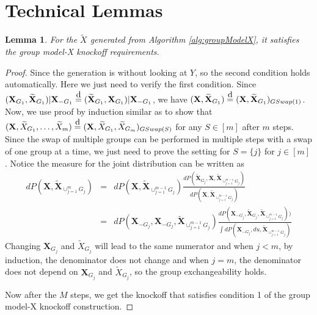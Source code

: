 \documentclass[11pt]{article}
\theoremstyle{plain}
\newtheorem{lemma}[theorem]{Lemma}
\theoremstyle{definition}
\theoremstyle{remark}
\newcommand\eqd{\stackrel{\mathclap{\normalfont\mbox{d}}}{=}}
\newcommand{\X}{\mathbf{X}}
\newcommand{\0}{\mathbf{0}}
\begin{document}
\section{Technical Lemmas}
\begin{lemma}\label{lem:gsknock}
For the $\widetilde{X}$ generated from Algorithm \ref{alg:groupModelX}, it satisfies the group model-X knockoff requirements.
\end{lemma}
\begin{proof}
Since the generation is without looking at $Y$, so the second condition holds automatically. Here we just need to verify the first condition. Since $(\X_{G_1},\widetilde{\X}_{G_1})|\X_{-G_1}\eqd (\widetilde{\X}_{G_1},\X_{G_1})|\X_{-G_1}$, we have $(\X,\widetilde{\X}_{G_1})\eqd (\X,\widetilde{\X}_{G_1})_{GSwap(1)}$. Now, we use proof by induction similar as \cite{candes2018panning} to show that $(\X,\widetilde{X}_{G_1},\dots,\widetilde{X}_m)\eqd (\X,\widetilde{X}_{G_1},\widetilde{X}_{G_m})_{GSwap(S)}$ for any $S\in [m]$ after $m$ steps. Since the swap of multiple groups can be performed in multiple steps with a swap of one group at a time, we just need to prove the setting for $S=\{j\}$ for $j\in [m]$. Notice the measure for the joint distribution can be written as
\begin{eqnarray*}
dP(\X,\widetilde{\X}_{\cup_{j=1}^m G_j})&=&dP(\X,\widetilde{\X}_{\cup_{j=1}^{m-1} G_j})\frac{dP(\widetilde{\X}_{G_j},\X,\widetilde{\X}_{\cup_{j=1}^{m-1} G_j})}{dP(\X,\widetilde{\X}_{\cup_{j=1}^{m-1} G_j})}\\
&=&dP(\X_{-G_j},\X_{-G_j},\widetilde{\X}_{\cup_{j=1}^{m-1} G_j})\frac{dP(\X_{-G_{j}},\widetilde{\X}_{G_j},\widetilde{\X}_{\cup_{j=1}^{m-1} G_j}))}{\int dP(\X_{-G_{j}},du,\widetilde{\X}_{\cup_{j=1}^{m-1} G_j})}
\end{eqnarray*}
Changing $\X_{G_j}$ and $\widetilde{X}_{G_j}$ will lead to the same numerator and when $j<m$, by induction, the denominator does not change and when $j=m$, the denominator does not depend on $\X_{G_j}$ and $\tilde{X}_{G_j}$, so the group exchangeability holds.

Now after the $M$ steps, we get the knockoff that satisfies condition 1 of the group model-X knockoff construction.
\end{proof}
\end{document}
